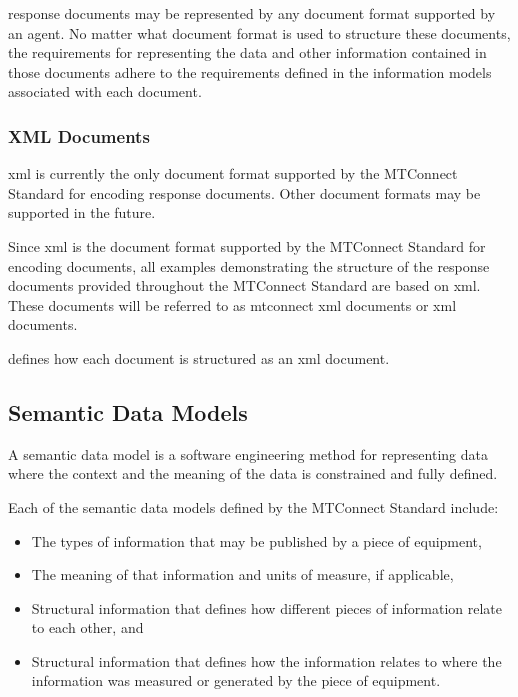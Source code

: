 \documentclass{mtconnect}	%
\begin{document}
\glspl{response document} may be represented by any document format supported by an \gls{agent}.  No matter what document format is used to structure these documents, the requirements for representing the data and other information contained in those documents \MUST adhere to the requirements defined in the \glspl{information model} associated with each document.

\subsubsection{XML Documents}
\label{sec:XML Documents}

\gls{xml} is currently the only document format supported by the MTConnect Standard for encoding \glspl{response document}.  Other document formats may be supported in the future.   

Since \gls{xml} is the document format supported by the MTConnect Standard for encoding documents, all examples demonstrating the structure of the \glspl{response document} provided throughout the MTConnect Standard are based on \gls{xml}.  These documents will be referred to as \glspl{mtconnect xml document} or \glspl{xml document}.

 defines how each document is structured as an \gls{xml document}.

\subsection{Semantic Data Models}

A \gls{semantic data model} is a software engineering method for representing data where the context and the meaning of the data is constrained and fully defined.

Each of the \glspl{semantic data model} defined by the MTConnect Standard include:

\begin{itemize}
\item The types of information that may be published by a piece of equipment,

\item The meaning of that information and units of measure, if applicable,

\item Structural information that defines how different pieces of information relate to each other, and

\item Structural information that defines how the information relates to where the information was measured or generated by the piece of equipment.
\end{itemize}
\end{document}
